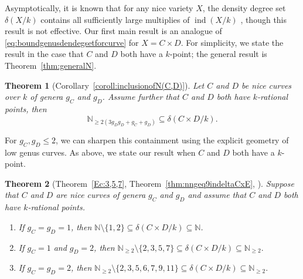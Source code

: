 \documentclass[a4paper,11pt]{amsart}
\theoremstyle{plain}
\newtheorem{thm}{Theorem}[section]
\theoremstyle{remark}
\newcommand{\nn}{\mathbb{N}}
\newcommand{\dendegs}{\delta}
\newcommand{\ind}{\operatorname{ind}}
\begin{document}
Asymptotically, it is known that for any nice variety \(X\), the density degree set \(\dendegs(X/k)\) contains all sufficiently large multiplies of \(\ind(X/k)\) \cite[Proposition B.0.1]{VV}, though this result is not effective.  Our first main result is an analogue of \eqref{eq:boundgenusdendegsetforcurve}
for \(X = C \times D\).  For simplicity, we state the result in the case that \(C\) and \(D\) both have a \(k\)-point; the general result is Theorem~\ref{thm:generalN}.

\begin{thm}[{Corollary~\ref{coroll:inclusionofN(C,D)}}]\label{thm:asym}
    Let $C$ and $D$ be nice curves over $k$ of genera $g_C$ and $g_D$. Assume further that $C$ and $D$ both have $k$-rational points, then 
    \[
    \nn_{ \geq 2(3g_D g_D + g_C + g_D) } \subseteq \dendegs(C \times D / k).
    \]
\end{thm}

For \(g_C, g_D \leq 2\), we can sharpen this containment using the explicit geometry of low genus curves. As above, we state our result when \(C\) and \(D\) both have a \(k\)-point.

\begin{thm}[{Theorem~\ref{Ec:3,5,7}, Theorem~\ref{thm:nngeq9indeltaCxE}, }]\label{thm:preciseresults}
Suppose that \(C\) and \(D\) are nice curves of genera \(g_C\) and \(g_D\) and assume that $C$ and $D$ both have $k$-rational points.
\begin{enumerate}[label = (\roman*)]
\item\label{main:g1} If \(g_C = g_D = 1\), then
$\nn \setminus \{1, 2\} \subseteq \dendegs(C \times D/k) \subseteq \nn$.
\item \label{main:g1g2} If \(g_C = 1\) and \(g_D = 2\), then
\(
    \nn_{\geq 2} \setminus \{2, 3, 5, 7\} \subseteq \dendegs(C\times D/k) \subseteq \nn_{\geq 2} .
\)
\item \label{main:g2} If \(g_C = g_D = 2\), then
\(\nn_{\geq 2} \setminus \{2, 3, 5, 6, 7, 9, 11\} \subseteq \dendegs(C\times D/k) \subseteq \nn_{\geq 2} .\)
\end{enumerate}
\end{thm}
\end{document}
